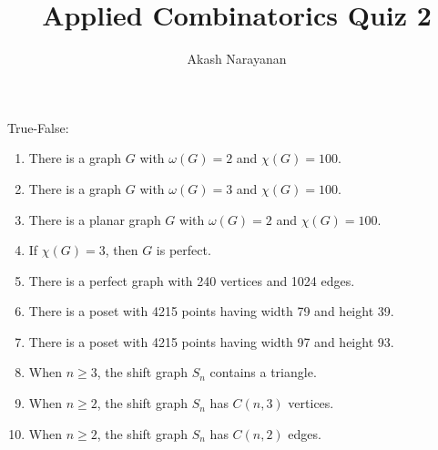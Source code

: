 \documentclass[12pt]{article}
\title{Applied Combinatorics Quiz 2}
\author{Akash Narayanan}
\begin{document}
  \maketitle

  True-False:

  \begin{enumerate}
    \item {} There is a graph \(G\) with \(\omega \left( G \right) = 2\) and \(\chi \left( G \right) = 100\).
    \item {} There is a graph \(G\) with \(\omega \left( G \right) = 3\) and \(\chi \left( G \right) = 100\).
    \item {} There is a planar graph \(G\) with \(\omega \left( G \right) = 2\) and \(\chi \left( G \right) = 100\).
    \item {} If \(\chi \left( G \right) = 3\), then \(G\) is perfect.
    \item {} There is a perfect graph with 240 vertices and 1024 edges.
    \item {} There is a poset with 4215 points having width 79 and height 39.
    \item {} There is a poset with 4215 points having width 97 and height 93.
    \item {} When \(n \geq 3\), the shift graph \(S_{n}\) contains a triangle.
    \item {} When \(n \geq 2\), the shift graph \(S_{n}\) has \(C \left( n, 3 \right)\) vertices.
    \item {} When \(n \geq 2\), the shift graph \(S_{n}\) has \(C \left( n, 2 \right)\) edges.
  \end{enumerate}
\end{document}
